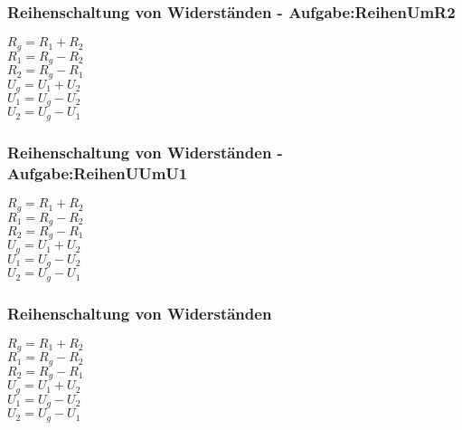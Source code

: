 \subsubsection{Reihenschaltung von Widerständen - Aufgabe:ReihenUmR2} 
\begin{minipage}{0.45\textwidth} 
$ R_{g}  = R_{1}  + R_{2} $\\ 
$ R_{1}  = R_{g}  - R_{2} $\\ 
$ R_{2}  = R_{g}  - R_{1} $\\ 
$ U_{g}  = U_{1}  + U_{2} $\\ 
$ U_{1}  = U_{g}  - U_{2} $\\ 
$ U_{2}  = U_{g}  - U_{1} $\\ 
\end{minipage} 
\begin{minipage}{0.45\textwidth} 
 
\end{minipage} 
\subsubsection{Reihenschaltung von Widerständen - Aufgabe:ReihenUUmU1} 
\begin{minipage}{0.45\textwidth} 
$ R_{g}  = R_{1}  + R_{2} $\\ 
$ R_{1}  = R_{g}  - R_{2} $\\ 
$ R_{2}  = R_{g}  - R_{1} $\\ 
$ U_{g}  = U_{1}  + U_{2} $\\ 
$ U_{1}  = U_{g}  - U_{2} $\\ 
$ U_{2}  = U_{g}  - U_{1} $\\ 
\end{minipage} 
\begin{minipage}{0.45\textwidth} 
 
\end{minipage} 
\subsubsection{Reihenschaltung von Widerständen} 
\begin{minipage}{0.45\textwidth} 
$ R_{g}  = R_{1}  + R_{2} $\\ 
$ R_{1}  = R_{g}  - R_{2} $\\ 
$ R_{2}  = R_{g}  - R_{1} $\\ 
$ U_{g}  = U_{1}  + U_{2} $\\ 
$ U_{1}  = U_{g}  - U_{2} $\\ 
$ U_{2}  = U_{g}  - U_{1} $\\ 
\end{minipage} 
\begin{minipage}{0.45\textwidth} 
 
\end{minipage} 
